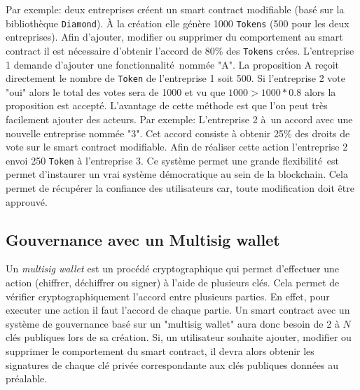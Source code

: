 Par exemple: deux entreprises créent un smart contract modifiable (basé sur la bibliothèque \texttt{Diamond}). À la création
elle génère 1000 \texttt{Tokens} (500 pour les deux entreprises). Afin d'ajouter, modifier ou supprimer 
du comportement au smart contract il est nécessaire d'obtenir l'accord de 80\% des \texttt{Tokens} crées. 
L'entreprise 1 demande d'ajouter une fonctionnalité nommée "A". La proposition A reçoit directement le nombre de \texttt{Token}
de l'entreprise 1 soit 500. Si l'entreprise 2 vote "oui" alors le total des votes sera de 1000 et vu que $1000 > 1000*0.8$
alors la proposition est accepté.
%
L'avantage de cette méthode est que l'on peut très facilement ajouter des acteurs.
%
Par exemple: L'entreprise 2 à un accord avec une nouvelle entreprise nommée "3". Cet accord consiste à obtenir
25\% des droits de vote sur le smart contract modifiable. Afin de réaliser cette action l'entreprise 2 envoi 250
\texttt{Token} à l'entreprise 3.
%
Ce système permet une grande flexibilité est permet d'instaurer un vrai système démocratique au sein de la blockchain.
Cela permet de récupérer la confiance des utilisateurs car, toute modification doit être approuvé.

\subsection{Gouvernance avec un Multisig wallet}

Un \emph{multisig wallet} est un procédé cryptographique qui permet d'effectuer une action (chiffrer, déchiffrer ou signer)
à l'aide de plusieurs clés. Cela permet de vérifier cryptographiquement l'accord entre plusieurs parties. En effet, pour
executer une action il faut l'accord de chaque partie. Un smart contract 
avec un système de gouvernance basé sur un "multisig wallet" aura donc besoin de 2 à $N$ clés publiques lors de sa création. Si, 
un utilisateur souhaite ajouter, modifier ou supprimer le comportement du smart contract, il devra alors obtenir les signatures
de chaque clé privée correspondante aux clés publiques données au préalable.
